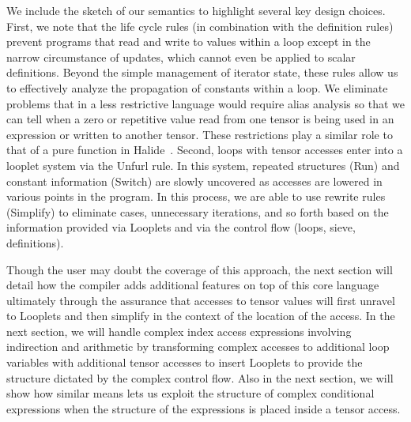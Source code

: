 We include the sketch of our semantics to highlight several key design choices.
%
First, we note that the life cycle rules (in combination with the definition rules) prevent programs that read and write to values within a loop except in the narrow circumstance of updates, which cannot even be applied to scalar definitions.
%
Beyond the simple management of iterator state, these rules allow us to effectively analyze the propagation of constants within a loop.
%
We eliminate problems that in a less restrictive language would require alias analysis so that we can tell when a zero or repetitive value read from one tensor is being used in an expression or written to another tensor.
%
These restrictions play a similar role to that of a pure function in Halide~\cite{ragan-kelley_halide_2013}.
%
Second, loops with tensor accesses enter into a looplet system via the Unfurl rule.
%
In this system, repeated structures (Run) and constant information (Switch)  are slowly uncovered as accesses are lowered in various points in the program.
%
In this process, we are able to use rewrite rules (Simplify) to eliminate cases, unnecessary iterations, and so forth based on the information provided via Looplets and via the control flow (loops, sieve, definitions).
%


Though the user may doubt the coverage of this approach, the next section will detail how the compiler adds additional features on top of this core language ultimately through the assurance that accesses to tensor values will first unravel to Looplets and then simplify in the context of the location of the access.
%
In the next section, we will handle complex index access expressions involving indirection and arithmetic by transforming complex accesses to additional loop variables with additional tensor accesses to insert Looplets to provide the structure dictated by the complex control flow.
%
Also in the next section, we will show how similar means lets us exploit the structure of complex conditional expressions when the structure of the expressions is placed inside a tensor access.






